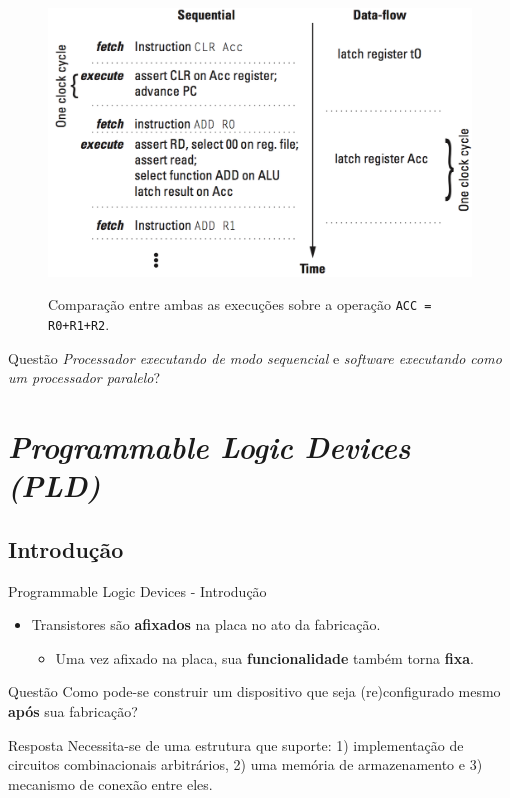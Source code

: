 \documentclass[aspectratio=169]{beamer}
\begin{document}
	\begin{frame}%
			\begin{figure}[h]
				\centering
				\caption{Comparação entre ambas as execuções sobre a operação \texttt{ACC = R0+R1+R2}.}
				\includegraphics[height=0.7\textheight]{img/print/assembly.png}
				\label{fig:assembly}
			\end{figure}
			\pause
			\begin{block}{Questão}
				\textit{Processador executando de modo sequencial} e \textit{software executando como um processador paralelo}?
			\end{block}
	\end{frame}

\section{\it{Programmable Logic Devices} (PLD)}
	\subsection{Introdução}
	\begin{frame}{Programmable Logic Devices - Introdução}
		\begin{itemize}
			\item Transistores são \textbf{afixados} na placa no ato da fabricação.
			\begin{itemize}
				\item Uma vez afixado na placa, sua \textbf{funcionalidade} também torna \textbf{fixa}.
			\end{itemize}
		\end{itemize}
		
		\begin{block}{Questão}
			Como pode-se construir um dispositivo que seja (re)configurado mesmo \textbf{após} sua fabricação?
		\end{block}
		\pause
		\vfill
		\begin{block}{Resposta}
			Necessita-se de uma estrutura que suporte: 1) implementação de circuitos combinacionais arbitrários, 2) uma memória de armazenamento e 3) mecanismo de conexão entre eles.
		\end{block}
	\end{frame}
	
\end{document}
